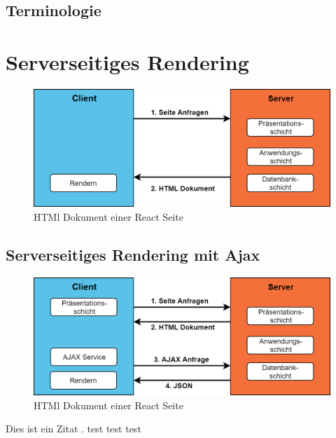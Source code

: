 \documentclass[runningheads]{llncs}
\begin{document}
\subsection{Terminologie}
\label{subsec:Terminologie}


\section{Serverseitiges Rendering}
\label{sec:Serverseitiges Rendering}

\begin{figure}[h]
  \centering
  \includegraphics[width=12cm]{images/server}
  \caption{HTMl Dokument einer React Seite}
\end{figure}



\subsection{Serverseitiges Rendering mit Ajax}
\label{subsec:Serverseitiges Rendering mit Ajax}

\begin{figure}[h]
  \centering
  \includegraphics[width=12cm]{images/serverajax}
  \caption{HTMl Dokument einer React Seite}
\end{figure}


Dies ist ein Zitat \cite{becker2008a}.
test\cite{IsomorphicApps}
test\cite{SearchFriendly}
test\cite{chen_chen_2016}
\end{document}
